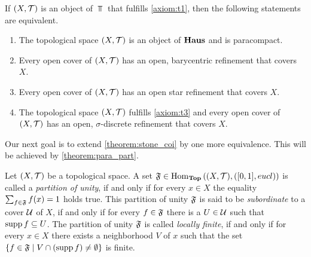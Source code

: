 \begin{theorem} \label{theorem:stone_coi} \cite[p. 77]{Top}
	If $\tspace$ is an object of $\Top$ that fulfills \ref{axiom:t1}, then the following statements are equivalent.
	\begin{enumerate}
		\item The topological space $\tspace$ is an object of $\mathbf{Haus}$ and is paracompact.
		
		\item Every open cover of $\tspace$ has an open, barycentric refinement that covers $X$. 
		
		\item Every open cover of $\tspace$ has an open star refinement that covers $X$. 
		
		\item The topological space $\tspace$ fulfills \ref{axiom:t3} and every open cover of $\tspace$ has an open, $\sigma$-discrete refinement that covers $X$.
	\end{enumerate}
\end{theorem}

Our next goal is to extend \ref{theorem:stone_coi} by one more equivalence. This will be achieved by \ref{theorem:para_part}.

\begin{definition}
	Let $\tspace$ be a topological space. A set $\partition \in \Hom_\Top\pbraces{\tspace, \pbraces{[0,1], \eucl}}$ is called a \textit{partition of unity}, if and only if for every $x \in X$ the equality $\sum_{f \in \mathfrak{F}} f(x) = 1$ holds true. This partition of unity $\mathfrak{F}$ is said to be \textit{subordinate} to a cover $\mathcal{U}$ of $X$, if and only if for every $f \in \mathfrak{F}$ there is a $U \in \mathcal{U}$ such that $\operatorname{supp} f \subseteq U$. The partition of unity $\mathfrak{F}$ is called \textit{locally finite}, if and only if for every $x \in X$ there exists a neighborhood $V$ of $x$ such that the set ${\left \{ f \in \mathfrak{F} \mid V \cap {\left ( \operatorname{supp}f \right )} \neq \emptyset \right \}}$ is finite.
\end{definition}

